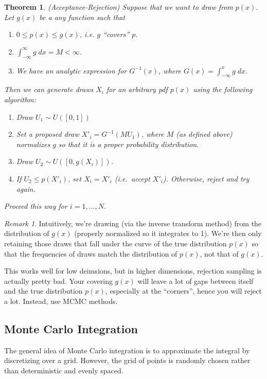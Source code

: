 \documentclass[12pt]{article}
\theoremstyle{plain}
\newtheorem{thm}{Theorem}[section]
\theoremstyle{definition}
\theoremstyle{remark}
\newtheorem*{rmk}{Remark}
\begin{document}
\begin{thm}\emph{(Acceptance-Rejection)}
Suppose that we want to draw from $p(x)$. Let $g(x)$ be a any function
such that
\begin{enumerate}
  \item $0 \leq p(x) \leq g(x)$, i.e. $g$ ``covers'' $p$.
  \item $\int^\infty_{-\infty} g \; dx = M < \infty$.
  \item We have an analytic expression for $G^{-1}(x)$, where $G(x) =
    \int_{-\infty}^x g \; dx$.
\end{enumerate}
Then we can generate draws $X_i$ for an arbitrary pdf $p(x)$ using the
following algorithm:
\begin{enumerate}
  \item Draw $U_1\sim U([0,1])$
  \item Set a proposed draw $X'_i = G^{-1}(MU_1)$, where $M$ (as defined
    above) normalizes $g$ so that it is a proper probability
    distribution.
  \item Draw $U_2\sim U([0, g(X_i)])$.
  \item If $U_2 \leq p(X'_i)$, set $X_i = X'_i$ (i.e.\ accept $X'_i$).
    Otherwise, reject and try again.
\end{enumerate}
Proceed this way for $i=1,\ldots,N$.
\end{thm}
\begin{rmk}
Intuitively, we're drawing (via the inverse transform method) from the
distribution of $g(x)$ (properly normalized so it integrates to 1).
We're then only retaining those draws that fall under the curve of the
true distribution $p(x)$ so that the frequencies of draws match the
distribution of $p(x)$, not that of $g(x)$.
\end{rmk}

This works well for low deimsions, but in higher dimensions, rejection
sampling is actually pretty bad. Your covering $g(x)$ will leave a lot
of gaps between itself and the true distribution $p(x)$, especially at
the ``corners'', hence you will reject a lot. Instead, use MCMC methods.

\subsection{Monte Carlo Integration}

The general idea of Monte Carlo integration is to approximate the
integral by discretizing over a grid. However, the grid of points is
randomly chosen rather than deterministic and evenly spaced.
\end{document}
